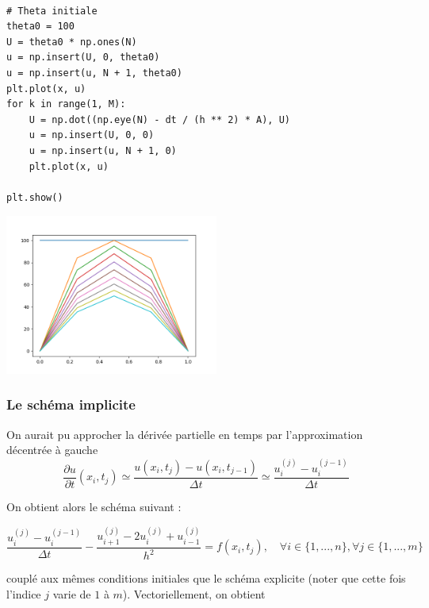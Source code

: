 \documentclass{beamer}
\begin{document}
 \begin{frame}[fragile] 
\begin{lstlisting}

# Theta initiale
theta0 = 100
U = theta0 * np.ones(N)
u = np.insert(U, 0, theta0)
u = np.insert(u, N + 1, theta0)
plt.plot(x, u)
for k in range(1, M):
    U = np.dot((np.eye(N) - dt / (h ** 2) * A), U)
    u = np.insert(U, 0, 0)
    u = np.insert(u, N + 1, 0)
    plt.plot(x, u)

plt.show()
  \end{lstlisting}

\end{frame}

\begin{frame}
 \begin{center}
\includegraphics[width=7cm]{chaleur1.png}
\end{center}
\end{frame}
  
  
  
\begin{frame}    
  \frametitle{Le schéma implicite}
On aurait pu approcher la dérivée partielle en temps par l'approximation décentrée à gauche
\[\frac{\partial u}{\partial t}(x_i,t_j) \simeq \frac{u(x_{i},t_{j})-u(x_{i},t_{j-1})}{\Delta t}\simeq
\frac{u_{i}^{(j)}-u_{i}^{(j-1)} }{\Delta t}\]


On obtient alors le schéma suivant :

\[
\frac{u_{i}^{(j)}-u_{i}^{(j-1)} }{\Delta t} - \frac{u_{i+1}^{(j)}-2u_{i}^{(j)}+u_{i-1}^{(j)}}{h^2} = f(x_i,t_j), \quad \forall i\in\{1,...,n\} ,  \forall j\in\{1,...,m\} 
\]

couplé aux mêmes conditions initiales que le schéma explicite (noter que cette fois l'indice $j$ varie de $1$ à $m$). Vectoriellement, on obtient
 \end{frame} 
  
\end{document}
